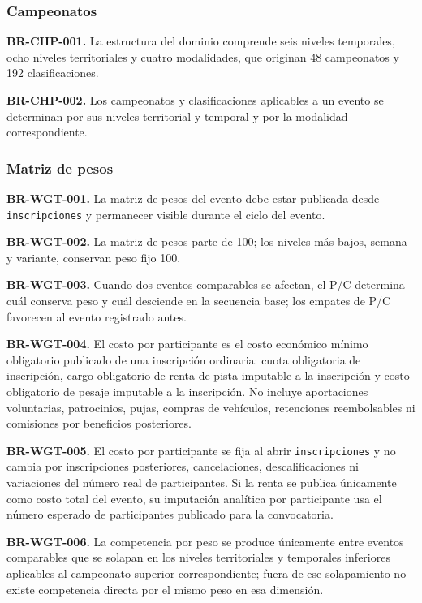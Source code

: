 \documentclass[10pt,letterpaper]{article}
\begin{document}
\subsubsection{Campeonatos}
\noindent\textbf{BR-CHP-001.} La estructura del dominio comprende seis niveles temporales, ocho niveles territoriales y cuatro modalidades, que originan 48 campeonatos y 192 clasificaciones.\par
\noindent\textbf{BR-CHP-002.} Los campeonatos y clasificaciones aplicables a un evento se determinan por sus niveles territorial y temporal y por la modalidad correspondiente.\par
\subsubsection{Matriz de pesos}
\noindent\textbf{BR-WGT-001.} La matriz de pesos del evento debe estar publicada desde \texttt{inscripciones} y permanecer visible durante el ciclo del evento.\par
\noindent\textbf{BR-WGT-002.} La matriz de pesos parte de 100; los niveles más bajos, semana y variante, conservan peso fijo 100.\par
\noindent\textbf{BR-WGT-003.} Cuando dos eventos comparables se afectan, el P/C determina cuál conserva peso y cuál desciende en la secuencia base; los empates de P/C favorecen al evento registrado antes.\par
\noindent\textbf{BR-WGT-004.} El costo por participante es el costo económico mínimo obligatorio publicado de una inscripción ordinaria: cuota obligatoria de inscripción, cargo obligatorio de renta de pista imputable a la inscripción y costo obligatorio de pesaje imputable a la inscripción. No incluye aportaciones voluntarias, patrocinios, pujas, compras de vehículos, retenciones reembolsables ni comisiones por beneficios posteriores.\par
\noindent\textbf{BR-WGT-005.} El costo por participante se fija al abrir \texttt{inscripciones} y no cambia por inscripciones posteriores, cancelaciones, descalificaciones ni variaciones del número real de participantes. Si la renta se publica únicamente como costo total del evento, su imputación analítica por participante usa el número esperado de participantes publicado para la convocatoria.\par
\noindent\textbf{BR-WGT-006.} La competencia por peso se produce únicamente entre eventos comparables que se solapan en los niveles territoriales y temporales inferiores aplicables al campeonato superior correspondiente; fuera de ese solapamiento no existe competencia directa por el mismo peso en esa dimensión.\par
\end{document}
